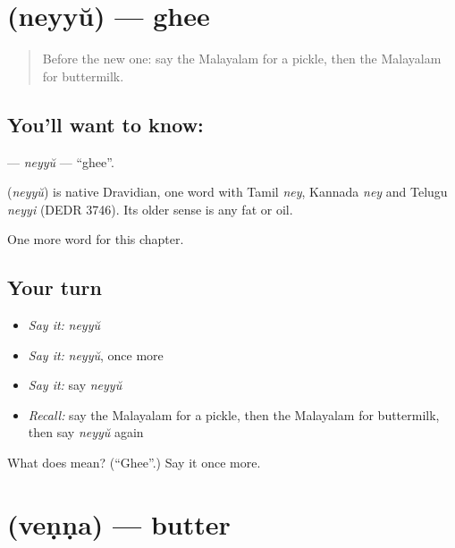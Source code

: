 \section[\texorpdfstring{\ml{നെയ്യ്} (neyyŭ)}{നെയ്യ് (neyyŭ)}]{ (neyyŭ) — ghee}

\label{lesson:ML-C208-neyyu}



\begin{quote}
Before the new one: say the Malayalam for a pickle, then the Malayalam for buttermilk.
\end{quote}

\subsection*{You'll want to know: }
\textbf{} — \emph{neyyŭ} — \textquotedblleft{}ghee\textquotedblright{}.

\begin{cousinweb}
\textbf{} (\emph{neyyŭ}) is native Dravidian, one word with Tamil \emph{ney}, Kannada \emph{ney} and Telugu \emph{neyyi} (DEDR 3746). Its older sense is any fat or oil.
\end{cousinweb}

\begin{grammarlens}[title={What you've built}]
One more word for this chapter.
\end{grammarlens}

\subsection*{Your turn}
\begin{itemize}
\raggedright
  \item \emph{Say it:} \emph{neyyŭ}
  \item \emph{Say it:} \emph{neyyŭ}, once more
  \item \emph{Say it:} say \emph{neyyŭ}
  \item \emph{Recall:} say the Malayalam for a pickle, then the Malayalam for buttermilk, then say \emph{neyyŭ} again
\end{itemize}

\begin{tcolorbox}[breakable,colback=teal!4,colframe=teal!35!black,title={Before you move on}]
What does  mean? (\textquotedblleft{}Ghee\textquotedblright{}.) Say it once more.
\end{tcolorbox}
\section[\texorpdfstring{\ml{വെണ്ണ} (veṇṇa)}{വെണ്ണ (veṇṇa)}]{ (veṇṇa) — butter}

